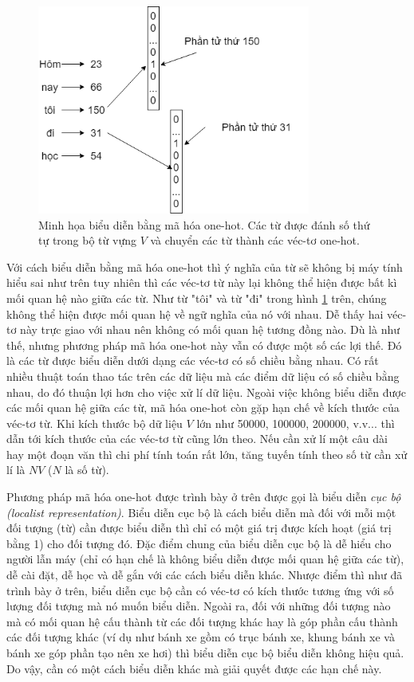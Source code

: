 \begin{figure}
	\centering
	\includegraphics[width=0.8\textwidth]{onehot-representation.png}
	\caption[Minh họa biểu diễn bằng mã hóa one-hot.]{Minh họa biểu diễn bằng mã hóa one-hot. Các từ được đánh số thứ tự trong bộ từ vựng $V$ và chuyển các từ thành các véc-tơ one-hot.}
	\label{fig_onehot-representation}
\end{figure}

Với cách biểu diễn bằng mã hóa one-hot thì ý nghĩa của từ sẽ không bị máy tính hiểu sai như trên tuy nhiên thì các véc-tơ từ này lại không thể hiện được bất kì mối quan hệ nào giữa các từ. Như từ "tôi" và từ "đi" trong hình \ref{fig_onehot-representation} trên, chúng không thể hiện được mối quan hệ về ngữ nghĩa của nó với nhau. Dễ thấy hai véc-tơ này trực giao với nhau nên không có mối quan hệ tương đồng nào. Dù là như thế, nhưng phương pháp mã hóa one-hot này vẫn có được một số các lợi thế. Đó là các từ được biểu diễn dưới dạng các véc-tơ có số chiều bằng nhau. Có rất nhiều thuật toán thao tác trên các dữ liệu mà các điểm dữ liệu có số chiều bằng nhau, do đó thuận lợi hơn cho việc xử lí dữ liệu. Ngoài việc không biểu diễn được các mối quan hệ giữa các từ, mã hóa one-hot còn gặp hạn chế về kích thước của véc-tơ từ. Khi kích thước bộ dữ liệu $V$ lớn như 50000, 100000, 200000, v.v... thì dẫn tới kích thước của các véc-tơ từ cũng lớn theo. Nếu cần xử lí một câu dài hay một đoạn văn thì chi phí tính toán rất lớn, tăng tuyến tính theo số từ cần xử lí là $NV$ ($N$ là số từ).

Phương pháp mã hóa one-hot được trình bày ở trên được gọi là biểu diễn \textit{cục bộ (localist representation)}. Biểu diễn cục bộ là cách biểu diễn mà đối với mỗi một đối tượng (từ) cần được biểu diễn thì chỉ có một giá trị được kích hoạt (giá trị bằng 1) cho đối tượng đó. Đặc điểm chung của biểu diễn cục bộ là dễ hiểu cho người lẫn máy (chỉ có hạn chế là không biểu diễn được mối quan hệ giữa các từ), dễ cài đặt, dễ học và dễ gắn với các cách biểu diễn khác. Nhược điểm thì như đã trình bày ở trên, biểu diễn cục bộ cần có véc-tơ có kích thước tương ứng với số lượng đối tượng mà nó muốn biểu diễn. Ngoài ra, đối với những đối tượng nào mà có mối quan hệ cấu thành từ các đối tượng khác hay là góp phần cấu thành các đối tượng khác (ví dụ như bánh xe gồm có trục bánh xe, khung bánh xe và bánh xe góp phần tạo nên xe hơi) thì biểu diễn cục bộ biểu diễn không hiệu quả. Do vậy, cần có một cách biểu diễn khác mà giải quyết được các hạn chế này.

